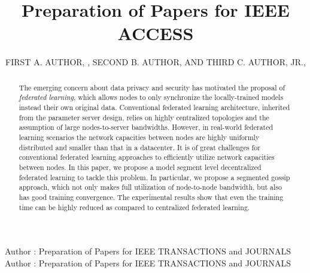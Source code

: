 \documentclass{ieeeaccess}
\begin{document}

\title{Preparation of Papers for IEEE ACCESS}
\author{\uppercase{First A. Author}, ,
\uppercase{Second B. Author, and Third C. Author,
Jr}.,
}
\address[1]{National Institute of Standards and 
Technology, Boulder, CO 80305 USA (e-mail: author@boulder.nist.gov)}
\address[2]{Department of Physics, Colorado State University, Fort Collins, 
CO 80523 USA (e-mail: author@lamar.colostate.edu)}
\address[3]{Electrical Engineering Department, University of Colorado, Boulder, CO 
80309 USA}

\markboth
{Author \headeretal: Preparation of Papers for IEEE TRANSACTIONS and JOURNALS}
{Author \headeretal: Preparation of Papers for IEEE TRANSACTIONS and JOURNALS}


\begin{abstract}
The emerging concern about data privacy and security has motivated the proposal of \emph{federated learning}, which allows nodes to only synchronize the locally-trained models instead their own original data. Conventional federated learning architecture, inherited from the parameter server design, relies on highly centralized topologies and the assumption of large nodes-to-server bandwidths. However, in real-world federated learning scenarios the network capacities between nodes are highly uniformly distributed and smaller than that in a datacenter. It is of great challenges for conventional federated learning approaches to efficiently utilize network capacities between nodes. In this paper, we propose a model segment level decentralized federated learning to tackle this problem. In particular, we propose a segmented gossip approach, which not only makes full utilization of node-to-node bandwidth, but also has good training convergence. The experimental results show that even the training time can be highly reduced as compared to centralized federated learning.
\end{abstract}
\end{document}
